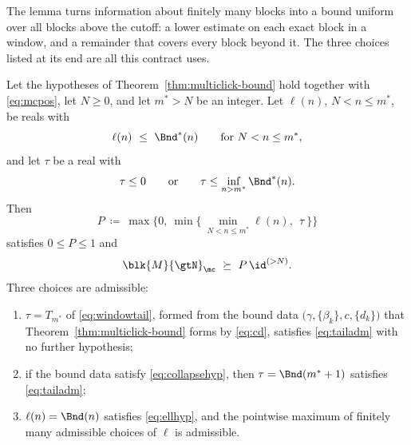 
The lemma turns information about finitely many blocks into a bound uniform
over all blocks above the cutoff: a lower estimate on each exact block in a
window, and a remainder that covers every block beyond it. The three choices
listed at its end are all this contract uses.

\begin{lemma}\label{lem:exactwindow}
Let the hypotheses of Theorem~\ref{thm:multiclick-bound} hold together with
\eqref{eq:mcpos}, let $N\ge0$, and let
$m^{\ast}>N$ be an integer. Let $\ell(n)$, $N<n\le m^{\ast}$, be reals with
\begin{equation}\label{eq:ellhyp}
  \ell(n)\ \le\ \Bnd^{\ast}(n)\qquad\text{for }N<n\le m^{\ast},
\end{equation}
and let $\tau$ be a real with
\begin{equation}\label{eq:tailadm}
  \tau\le0
  \qquad\text{or}\qquad
  \tau\le\inf_{n>m^{\ast}}\Bnd^{\ast}(n).
\end{equation}
Then
\begin{equation}\label{eq:exactcomposite}
  P\ \coloneqq\ \max\Big\{0,\ \min\Big\{\ \min_{N<n\le m^{\ast}}\ell(n),
   \ \ \tau\ \Big\}\Big\}
\end{equation}
satisfies $0\le P\le1$ and
\begin{equation}\label{eq:exactstatement}
  \blk{M}{\gtN}_{\mc}\ \succeq\ P\,\id^{(>N)} .
\end{equation}
Three choices are admissible:
\begin{enumerate}[label=(\roman*),leftmargin=3.0em]
\item $\tau=T_{m^{\ast}}$ of \eqref{eq:windowtail}, formed from the bound
  data $\big(\gamma,\{\beta_k\},c,\{d_k\}\big)$ that
  Theorem~\ref{thm:multiclick-bound} forms by \eqref{eq:cd}, satisfies
  \eqref{eq:tailadm} with no further hypothesis;
\item if the bound data satisfy \eqref{eq:collapsehyp}, then
  $\tau=\Bnd(m^{\ast}+1)$ satisfies \eqref{eq:tailadm};
\item $\ell(n)=\Bnd(n)$ satisfies \eqref{eq:ellhyp}, and the pointwise maximum
  of finitely many admissible choices of $\ell$ is admissible.
\end{enumerate}
\end{lemma}


